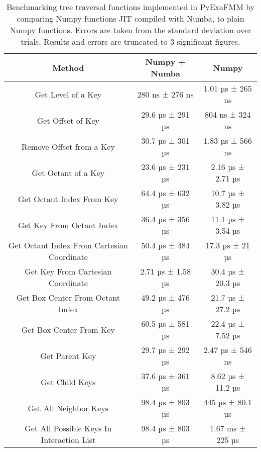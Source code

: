\begin{table}[ht]
    \centering %
    \begin{tabular}{c c c} %
    \hline\hline %
    Method & Numpy + Numba & Numpy \\ [0.5ex] %
    \hline %
    Get Level of a Key & 280 ns ± 276 ns  & 1.01 µs ± 265 ns \\ %
    Get Offset of Key & 29.6 µs ± 291 µs & 804 ns ± 324 ns \\
    Remove Offset from a Key & 30.7 µs ± 301 µs & 1.83 µs ± 566 ns \\
    Get Octant of a Key & 23.6 µs ± 231 µs & 2.16 µs ± 2.71 µs \\
    Get Octant Index From Key & 64.4 µs ± 632 µs & 10.7 µs ± 3.82 µs \\
    Get Key From Octant Index & 36.4 µs ± 356 µs & 11.1 µs ± 3.54 µs \\
    Get Octant Index From Cartesian Coordinate & 50.4 µs ± 484 µs & 17.3 µs ± 21 µs \\
    Get Key From Cartesian Coordinate & 2.71 µs ± 1.58 µs & 30.4 µs ± 20.3 µs \\
    Get Box Center From Octant Index & 49.2 µs ± 476 µs & 21.7 µs ± 27.2 µs \\
    Get Box Center From Key & 60.5 µs ± 581 µs & 22.4 µs ± 7.52 µs \\
    Get Parent Key & 29.7 µs ± 292 µs & 2.47 µs ± 546 ns \\
    Get Child Keys & 37.6 µs ± 361 µs & 8.62 µs ± 11.2 µs \\
    Get All Neighbor Keys & 98.4 µs ± 803 µs & 445 µs ± 80.1 µs\\
    Get All Possible Keys In Interaction List & 98.4 µs ± 803 µs & 1.67 ms ± 225 µs \\ [1ex] %
    \hline %
    \end{tabular}
    \label{table:3_1_jit} %
    \caption{
        Benchmarking tree traversal functions implemented in \gls{PyExaFMM} by
        comparing Numpy functions \gls{JIT} compiled with Numba, to plain Numpy functions.
        Errors are taken from the standard deviation over trials. Results and
        errors are truncated to 3 significant figures.
        } %
\end{table}


